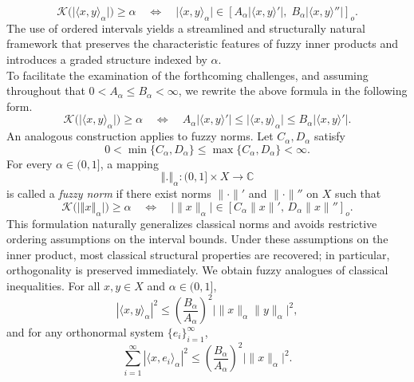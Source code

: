 \documentclass[preprint,12pt]{elsarticle}
\newcommand{\norm}[1]{\left\Vert#1\right\Vert}
\theoremstyle{definition}
\begin{document}
	\begin{equation*}
		\mathcal{K}\bigl(\big|\langle  x, y \rangle_\alpha \big|\bigr)\ge\alpha
		\quad\Longleftrightarrow\quad
		\big|\langle  x, y \rangle_\alpha \big|\in
		[A_\alpha|\langle x,y\rangle'|,\;B_\alpha|\langle x,y\rangle''|]_o.
	\end{equation*}
	The use of ordered intervals yields a streamlined and structurally natural framework that preserves the characteristic features of fuzzy inner products and introduces a graded structure indexed by $\alpha$.\\
	To facilitate the examination of the forthcoming challenges, and assuming throughout that 
	$ 0<A_\alpha\le B_\alpha<\infty$, we rewrite the above formula in the following form.
	\begin{equation*}
		\mathcal{K}\bigl(\big|\langle  x, y \rangle_\alpha \big|\bigr)\ge\alpha
	\quad\Longleftrightarrow\quad	A_\alpha|\langle x,y\rangle'|
		\le \big|\langle  x, y \rangle_\alpha \big|
		\le B_\alpha|\langle x,y\rangle'|.
	\end{equation*}
	An analogous construction applies to fuzzy norms. Let $C_\alpha,D_\alpha$ satisfy
	\[
	0<\min\{C_\alpha,D_\alpha\}\le\max\{C_\alpha,D_\alpha\}<\infty.
	\]
	For every $\alpha\in (0,1]$, a mapping
	\[
	\norm{.}_\alpha:(0,1]\times X\to\mathbb{C}
	\]
	is called a \emph{fuzzy norm} if there exist norms $\|\cdot\|'$ and $\|\cdot\|''$ on $X$ such that
	\begin{equation*}
		\mathcal{K}\big(\big|\norm{x}_\alpha \big|\big)\ge\alpha
		\quad\Longleftrightarrow\quad
		\big|\|x\|_\alpha\big|\in[C_\alpha\|x\|',\,D_\alpha\|x\|'']_o.
	\end{equation*}
	This formulation naturally generalizes classical norms and avoids restrictive ordering assumptions on the interval bounds.
	Under these assumptions on the inner product, most classical structural properties are recovered; in particular, orthogonality is preserved immediately.
	We obtain fuzzy analogues of classical inequalities. For all $x,y\in X$ and $\alpha\in(0,1]$,
	\begin{equation*}
		|\langle x,y\rangle_\alpha|^2
		\le \left(\frac{B_\alpha}{A_\alpha}\right)^2\big\vert\|x\|_\alpha\|y\|_\alpha\big\vert^2,
	\end{equation*}
	and for any orthonormal system $\{e_i\}^\infty_{i=1}$,
	\begin{equation*}
		\sum_{i=1}^{\infty}|\langle x,e_i\rangle_\alpha|^2
		\le \left(\frac{B_\alpha}{A_\alpha}\right)^2\big\vert\|x\|_\alpha\big\vert^2.
	\end{equation*}
\end{document}
